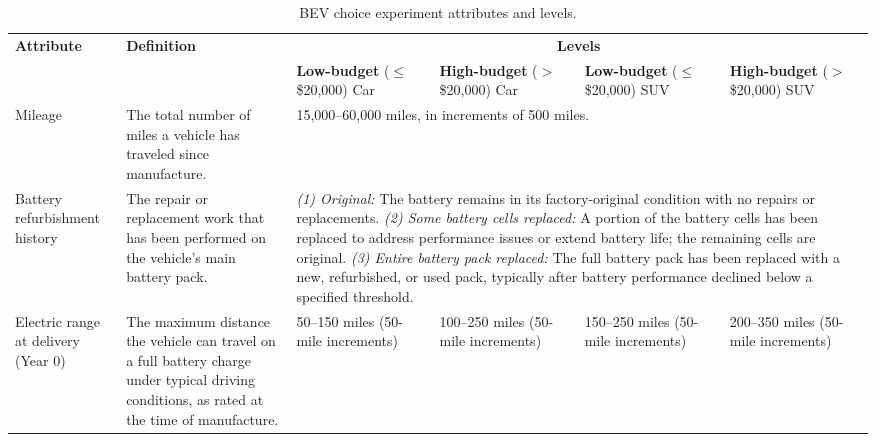 \documentclass[a4paper,fleqn]{cas-sc}   %
\begin{document}
\clearpage
\begin{landscape}
\begin{singlespace}
\begin{table}[pos=H]
\caption{BEV choice experiment attributes and levels.}
\label{table:dce_attributes}
{\renewcommand{\arraystretch}{1.4}
\begin{tabular}{p{2.7cm} p{4.0cm} p{3.2cm} p{3.2cm} p{3.2cm} p{3.2cm}}
\toprule
\multirow{2}{*}{\textbf{Attribute}} & \multirow{2}{*}{\textbf{Definition}} & \multicolumn{4}{c}{\textbf{Levels}} \\
\cmidrule(lr){3-6}
 & & \textbf{Low-budget} \newline ($\leq$\$20,000) Car & \textbf{High-budget} \newline ($>$\$20,000) Car & \textbf{Low-budget} \newline ($\leq$\$20,000) SUV & \textbf{High-budget} \newline ($>$\$20,000) SUV \\
\midrule
Mileage & The total number of miles a vehicle has traveled since manufacture. & \multicolumn{4}{p{14cm}}{15,000--60,000 miles, in increments of 500 miles.} \\
\addlinespace[4pt]
Battery refurbishment history & The repair or replacement work that has been performed on the vehicle's main battery pack. & \multicolumn{4}{p{14cm}}{%
  \textit{(1) Original:} The battery remains in its factory-original condition with no repairs or replacements.\newline
  \textit{(2) Some battery cells replaced:} A portion of the battery cells has been replaced to address performance issues or extend battery life; the remaining cells are original.\newline
  \textit{(3) Entire battery pack replaced:} The full battery pack has been replaced with a new, refurbished, or used pack, typically after battery performance declined below a specified threshold.} \\
\addlinespace[4pt]
Electric range at delivery (Year 0) & The maximum distance the vehicle can travel on a full battery charge under typical driving conditions, as rated at the time of manufacture. & 50--150 miles \newline (50-mile increments) & 100--250 miles \newline (50-mile increments) & 150--250 miles \newline (50-mile increments) & 200--350 miles \newline (50-mile increments) \\

\end{tabular}}
\end{table}
\end{singlespace}
\end{landscape}
\end{document}
